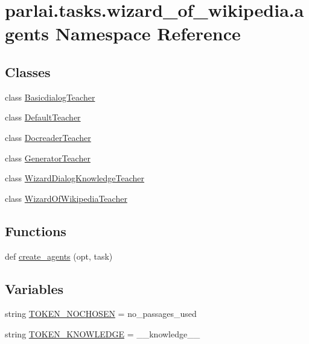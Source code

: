 \hypertarget{namespaceparlai_1_1tasks_1_1wizard__of__wikipedia_1_1agents}{}\section{parlai.\+tasks.\+wizard\+\_\+of\+\_\+wikipedia.\+agents Namespace Reference}
\label{namespaceparlai_1_1tasks_1_1wizard__of__wikipedia_1_1agents}
\subsection*{Classes}
\begin{DoxyCompactItemize}
\item 
class \hyperlink{classparlai_1_1tasks_1_1wizard__of__wikipedia_1_1agents_1_1BasicdialogTeacher}{Basicdialog\+Teacher}
\item 
class \hyperlink{classparlai_1_1tasks_1_1wizard__of__wikipedia_1_1agents_1_1DefaultTeacher}{Default\+Teacher}
\item 
class \hyperlink{classparlai_1_1tasks_1_1wizard__of__wikipedia_1_1agents_1_1DocreaderTeacher}{Docreader\+Teacher}
\item 
class \hyperlink{classparlai_1_1tasks_1_1wizard__of__wikipedia_1_1agents_1_1GeneratorTeacher}{Generator\+Teacher}
\item 
class \hyperlink{classparlai_1_1tasks_1_1wizard__of__wikipedia_1_1agents_1_1WizardDialogKnowledgeTeacher}{Wizard\+Dialog\+Knowledge\+Teacher}
\item 
class \hyperlink{classparlai_1_1tasks_1_1wizard__of__wikipedia_1_1agents_1_1WizardOfWikipediaTeacher}{Wizard\+Of\+Wikipedia\+Teacher}
\end{DoxyCompactItemize}
\subsection*{Functions}
\begin{DoxyCompactItemize}
\item 
def \hyperlink{namespaceparlai_1_1tasks_1_1wizard__of__wikipedia_1_1agents_a89bd55d60a50f2604b1eb59ab0e064bc}{create\+\_\+agents} (opt, task)
\end{DoxyCompactItemize}
\subsection*{Variables}
\begin{DoxyCompactItemize}
\item 
string \hyperlink{namespaceparlai_1_1tasks_1_1wizard__of__wikipedia_1_1agents_a77fb4cd4f27c9b47db8e4d7b3167701d}{T\+O\+K\+E\+N\+\_\+\+N\+O\+C\+H\+O\+S\+EN} = \textquotesingle{}no\+\_\+passages\+\_\+used\textquotesingle{}
\item 
string \hyperlink{namespaceparlai_1_1tasks_1_1wizard__of__wikipedia_1_1agents_a1bf3cbe02594ea63d40c785b653b8669}{T\+O\+K\+E\+N\+\_\+\+K\+N\+O\+W\+L\+E\+D\+GE} = \textquotesingle{}\+\_\+\+\_\+knowledge\+\_\+\+\_\+\textquotesingle{}
\end{DoxyCompactItemize}


